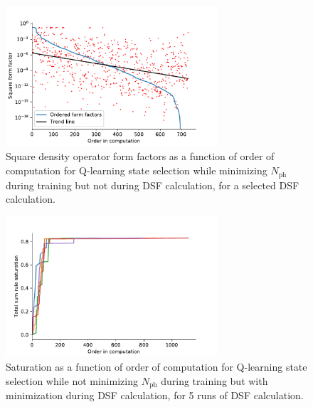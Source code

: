 \documentclass[11pt, a4paper]{report} %
\begin{document}
\begin{figure}[tb!]
  \centering
  \includegraphics[width=0.7\textwidth]{ff_sizes_rand_False_check_train_True_check_eval_False.pdf}
  \caption{Square density operator form factors as a function of order of computation for Q-learning state selection while minimizing \(N_{\mathrm{ph}}\) during training but not during DSF calculation, for a selected DSF calculation.}\label{fig:ff_sizes_rand_False_check_train_True_check_eval_False}
\end{figure}

\begin{figure}[tb!]
  \centering
  \includegraphics[width=0.7\textwidth]{saturation_histories_rand_False_check_train_False_check_eval_True.pdf}
  \caption{Saturation as a function of order of computation for Q-learning state selection while not minimizing \(N_{\mathrm{ph}}\) during training but with minimization during DSF calculation, for 5 runs of DSF calculation.}\label{fig:saturation_histories_rand_False_check_train_False_check_eval_True}
\end{figure}
\end{document}
